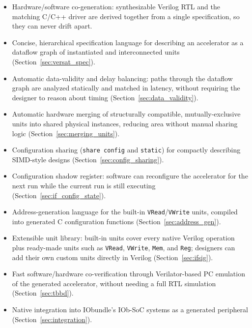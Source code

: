 %

\begin{itemize}
  \itemsep-0.5em
  \item Hardware/software co-generation: synthesizable Verilog RTL and the
    matching C/C++ driver are derived together from a single specification,
    so they can never drift apart.
  \item Concise, hierarchical specification language for describing an
    accelerator as a dataflow graph of instantiated and interconnected
    units (Section~\ref{sec:versat_spec}).
  \item Automatic data-validity and delay balancing: paths through the
    dataflow graph are analyzed statically and matched in latency, without
    requiring the designer to reason about timing (Section~\ref{sec:data_validity}).
  \item Automatic hardware merging of structurally compatible,
    mutually-exclusive units into shared physical instances, reducing area
    without manual sharing logic (Section~\ref{sec:merging_units}).
  \item Configuration sharing (\texttt{share config} and \texttt{static})
    for compactly describing SIMD-style designs (Section~\ref{sec:config_sharing}).
  \item Configuration shadow register: software can reconfigure the
    accelerator for the next run while the current run is still executing
    (Section~\ref{sec:if_config_state}).
  \item Address-generation language for the built-in \texttt{VRead}/\texttt{VWrite}
    units, compiled into generated C configuration functions
    (Section~\ref{sec:address_gen}).
  \item Extensible unit library: built-in units cover every native Verilog
    operation plus ready-made units such as \texttt{VRead}, \texttt{VWrite},
    \texttt{Mem}, and \texttt{Reg}; designers can add their own custom
    units directly in Verilog (Section~\ref{sec:ifsig}).
  \item Fast software/hardware co-verification through Verilator-based PC
    emulation of the generated accelerator, without needing a full RTL
    simulation (Section~\ref{sec:tbbd}).
  \item Native integration into IObundle's IOb-SoC systems as a generated
    peripheral (Section~\ref{sec:integration}).
\end{itemize}
